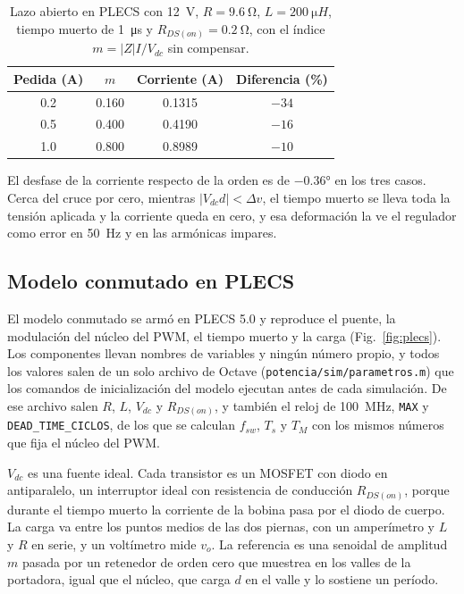 \documentclass[journal]{IEEEtran}
\begin{document}
\begin{table}[!ht]
	\centering
	\caption{Lazo abierto en PLECS con \SI{12}{V}, $R=\SI{9.6}{\ohm}$, $L=\SI{200}{\micro H}$, tiempo muerto de \SI{1}{\micro s} y $R_{DS(on)}=\SI{0.2}{\ohm}$, con el índice $m=|Z|I/V_{dc}$ sin compensar.}
	\label{tab:lazo_abierto}
	\begin{tabular}{cccc}
		\toprule
		Pedida (A) & $m$ & Corriente (A) & Diferencia (\%) \\
		\midrule
		\num{0.2} & \num{0.160} & \num{0.1315} & $-34$ \\
		\num{0.5} & \num{0.400} & \num{0.4190} & $-16$ \\
		\num{1.0} & \num{0.800} & \num{0.8989} & $-10$ \\
		\bottomrule
	\end{tabular}
\end{table}

El desfase de la corriente respecto de la orden es de $-\ang{0.36}$ en los tres casos. Cerca del cruce por cero, mientras $|V_{dc}d|<\Delta v$, el tiempo muerto se lleva toda la tensión aplicada y la corriente queda en cero, y esa deformación la ve el regulador como error en \SI{50}{Hz} y en las armónicas impares.

\subsection{Modelo conmutado en PLECS}
\label{sec:plecs}
El modelo conmutado se armó en PLECS 5.0 y reproduce el puente, la modulación del núcleo del PWM, el tiempo muerto y la carga (Fig.~\ref{fig:plecs}). Los componentes llevan nombres de variables y ningún número propio, y todos los valores salen de un solo archivo de Octave (\texttt{potencia/sim/parametros.m}) que los comandos de inicialización del modelo ejecutan antes de cada simulación. De ese archivo salen $R$, $L$, $V_{dc}$ y $R_{DS(on)}$, y también el reloj de \SI{100}{MHz}, \texttt{MAX} y \texttt{DEAD\_TIME\_CICLOS}, de los que se calculan $f_{sw}$, $T_s$ y $T_M$ con los mismos números que fija el núcleo del PWM.

$V_{dc}$ es una fuente ideal. Cada transistor es un MOSFET con diodo en antiparalelo, un interruptor ideal con resistencia de conducción $R_{DS(on)}$, porque durante el tiempo muerto la corriente de la bobina pasa por el diodo de cuerpo. La carga va entre los puntos medios de las dos piernas, con un amperímetro y $L$ y $R$ en serie, y un voltímetro mide $v_o$. La referencia es una senoidal de amplitud $m$ pasada por un retenedor de orden cero que muestrea en los valles de la portadora, igual que el núcleo, que carga $d$ en el valle y lo sostiene un período.
\end{document}
